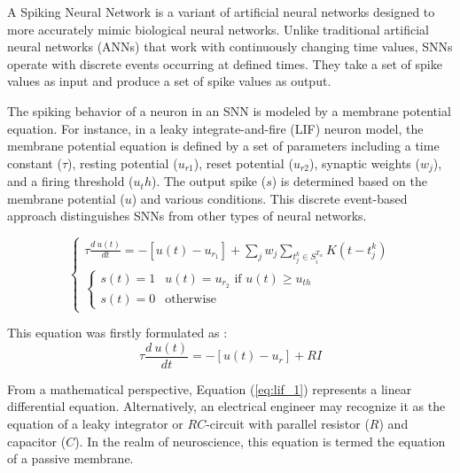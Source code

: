 \documentclass[11pt]{article}
\begin{document}
A Spiking Neural Network is a variant of artificial neural networks designed to more accurately mimic biological neural networks. Unlike traditional artificial neural networks (ANNs) that work with continuously changing time values, SNNs operate with discrete events occurring at defined times. They take a set of spike values as input and produce a set of spike values as output.

The spiking behavior of a neuron in an SNN is modeled by a membrane potential equation. For instance, in a leaky integrate-and-fire (LIF) neuron model, the membrane potential equation is defined by a set of parameters including a time constant ($\tau$), resting potential ($u_{r1}$), reset potential ($u_{r2}$), synaptic weights ($w_j$), and a firing threshold ($u_th$). The output spike ($s$) is determined based on the membrane potential ($u$) and various conditions. This discrete event-based approach distinguishes SNNs from other types of neural networks.\cite{rething_comparison_ann_snn}

\begin{equation}
  \begin{cases}
    \tau \frac{d \: u(t)}{dt} = - [u(t) - u_{r_1}] + \sum_j w_j \sum_{t_j^k \in  S_i^{T_w}} K(t - t_j^k) \\
    \begin{cases}
      s(t) = 1 & u(t) = u_{r_2} \text{ if } u(t) \geq u_{th} \\
      s(t) = 0 & \text{otherwise}
    \end{cases}
  \end{cases}
  \label{eq:membrane_potential}
\end{equation}


This equation was firstly formulated as : 
\begin{equation}
  \tau \frac{d \: u(t)}{dt} = - [u(t) - u_{r}] + RI
  \label{eq:lif_1}
\end{equation}

From a mathematical perspective, Equation (\ref{eq:lif_1}) represents a linear differential equation. Alternatively, an electrical engineer may recognize it as the equation of a leaky integrator or $RC$-circuit with parallel resistor ($R$) and capacitor ($C$). In the realm of neuroscience, this equation is termed the equation of a passive membrane. \cite{neuronal_dynamics}
\end{document}
